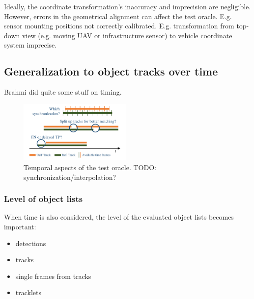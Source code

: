 \documentclass[conference]{IEEEtran}
\begin{document}
Ideally, the coordinate transformation's inaccuracy and imprecision are negligible. 
However, errors in the geometrical alignment can affect the test oracle. 
E.g. sensor mounting positions not correctly calibrated. 
E.g. transformation from top-down view (e.g. moving UAV or infrastructure sensor) to vehicle coordinate system imprecise. 



\subsection{Generalization to object tracks over time}
\label{sec:oracle_time}

Brahmi \cite{Brahmi2020diss} did quite some stuff on timing.


\begin{figure}[t]
	\centering
	\vspace*{2mm}
	\includegraphics[width=0.49\textwidth]{img/timeline.pdf}
	\caption{Temporal aspects of the test oracle. TODO: synchronization/interpolation?
	}
	\label{fig:timeline}
\end{figure}

\subsubsection{Level of object lists}

When time is also considered, the level of the evaluated object lists becomes important:
\begin{itemize}
\item detections
\item tracks
\item single frames from tracks
\item tracklets
\end{itemize}
\end{document}
